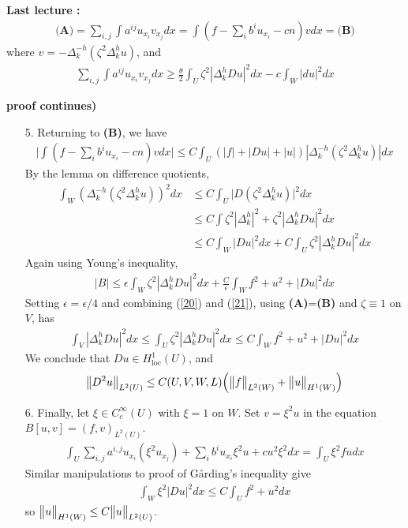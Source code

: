 \documentclass[12pt,a4paper]{report}
\newenvironment{proof}
{\begin{changemargin}{1cm}{0.5cm} 
	}%
	{\end{changemargin}
}
\begin{document}
\textbf{Last lecture :} 
\begin{align*}
\textbf{(A)} = \sum_{i,j} \int a^{ij} u_{x_i}v_{x_j} dx = \int (f- \sum_i b^i u_{x_i} -cn) vdx = \textbf{(B)}
\end{align*}
where $v = -\Delta^{-h}_k (\zeta^2 \Delta^h_k u)$, and 
\begin{align}
\sum_{i,j} \int a^{ij} u_{x_i}v_{x_j} dx  \geq \frac{\theta}{2} \int_U \zeta^2 |\Delta_k^h Du |^2 dx - c\int_W |du|^2 dx \label{20}
\end{align}
\s

\begin{proof}
\textbf{proof continues)} \begin{itemize}
\item[5.] Returning to \textbf{(B)}, we have
\begin{align*}
\Big| \int (f- \sum_i b^i u_{x_i} -cn) vdx \Big| \leq C \int_U (|f|+|Du|+|u|) | \Delta_k^{-h}(\zeta^2 \Delta_k^h u) | dx
\end{align*}
By the lemma on difference quotients,
\begin{align*}
\int_W (\Delta^{-h}_k (\zeta^2 \Delta^h_k u))^2 dx &\leq C \int_U \Big| D(\zeta^2 \Delta_k^h u) \Big|^2 dx \\
&\leq C \int \zeta^2 |\Delta_k^h|^2 + \zeta^2 |\Delta_k^h Du|^2 dx \\
&\leq C\int_W |Du|^2 dx + C \int_U \zeta^2 |\Delta_k^h Du|^2 dx
\end{align*}
Again using Young's inequality,
\begin{align}
|B| \leq \epsilon \int_W \zeta^2 |\Delta_k^h Du|^2 dx + \frac{C}{\epsilon} \int_W f^2 + u^2 +|Du|^2 dx \label{21}
\end{align}
Setting $\epsilon = \epsilon/4$ and combining (\ref{20}) and (\ref{21}), using \textbf{(A)}=\textbf{(B)} and $\zeta \equiv 1$ on $V$, has
\begin{align*}
\int_V |\Delta_k^h Du|^2 dx \leq \int_U \zeta^2 |\Delta_k^h Du|^2 dx \leq C\int_W f^2 + u^2 +|Du|^2 dx
\end{align*}
We conclude that $Du \in H^1_{\text{loc}}(U)$, and
\begin{align*}
\bigl\lVert D^2 u\bigr\rVert_{L^2(U)} \leq C(U,V,W,L) \Big( \bigl\lVert f\bigr\rVert_{L^2(W)} + \bigl\lVert u\bigr\rVert_{H^1(W)} \Big)
\end{align*}
\item[6.] Finally, let $\xi \in C^{\infty}_c(U)$ with $\xi =1$ on $W$. Set $v = \xi^2 u$ in the equation $B[u,v] = (f,v)_{L^2(U)}$.
\begin{align*}
\int_U \sum_{i,j} a^{i,j}u_{x_i}(\xi^2 u_{x_j}) + \sum_i b^i u_{x_i} \xi^2 u + cu^2 \xi^2 dx = \int_U \xi^2 f udx
\end{align*}
Similar manipulations to proof of G{\aa}rding's inequality give
\begin{align*}
\int_W \xi^2 |Du|^2 dx \leq C \int_U f^2 +u^2 dx
\end{align*}
so $\bigl\lVert u\bigr\rVert_{H^1(W)} \leq C\bigl\lVert u\bigr\rVert_{L^2(U)}$.
\end{itemize}
\eop
\end{proof}
\s
\end{document}
